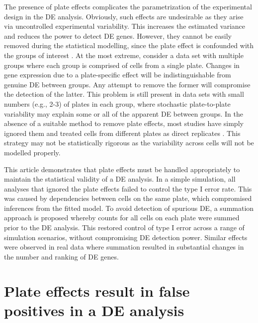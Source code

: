 \documentclass[oupdraft]{bio}
\begin{document}
The presence of plate effects complicates the parametrization of the experimental design in the DE analysis.
Obviously, such effects are undesirable as they arise via uncontrolled experimental variability.
This increases the estimated variance and reduces the power to detect DE genes.
However, they cannot be easily removed during the statistical modelling, since the plate effect is confounded with the groups of interest \citep{hicks2015widespread}.
At the most extreme, consider a data set with multiple groups where each group is comprised of cells from a single plate.
Changes in gene expression due to a plate-specific effect will be indistinguishable from genuine DE between groups.
Any attempt to remove the former will compromise the detection of the latter.
This problem is still present in data sets with small numbers (e.g., 2-3) of plates in each group, 
    where stochastic plate-to-plate variability may explain some or all of the apparent DE between groups.
In the absence of a suitable method to remove plate effects, most studies have simply ignored them and treated cells from different plates as direct replicates \citep{kolod2015single,trapnell2014dynamics,avraham2015pathogen}.
This strategy may not be statistically rigorous as the variability across cells will not be modelled properly.

This article demonstrates that plate effects must be handled appropriately to maintain the statistical validity of a DE analysis.
In a simple simulation, all analyses that ignored the plate effects failed to control the type I error rate.
This was caused by dependencies between cells on the same plate, which compromised inferences from the fitted model.
To avoid detection of spurious DE, a summation approach is proposed whereby counts for all cells on each plate were summed prior to the DE analysis.
This restored control of type I error across a range of simulation scenarios, without compromising DE detection power.
Similar effects were observed in real data where summation resulted in substantial changes in the number and ranking of DE genes.

\section{Plate effects result in false positives in a DE analysis}
\end{document}
